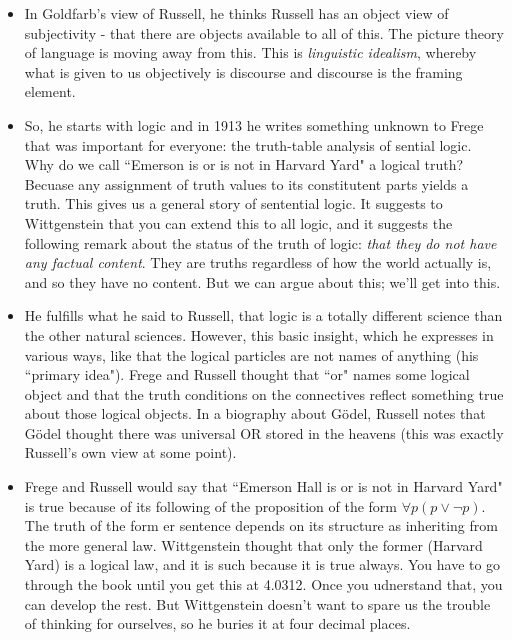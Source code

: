 \documentclass[12pt]{article}
\theoremstyle{definition}
\begin{document}
\begin{itemize}
    \item In Goldfarb's view of Russell, he thinks Russell has an object view of subjectivity - that there are objects available to all of this. The picture theory of language is moving away from this. This is \textit{linguistic idealism}, whereby what is given to us objectively is discourse and discourse is the framing element.
    \item So, he starts with logic and in 1913 he writes something unknown to Frege that was important for everyone: the truth-table analysis of sential logic. Why do we call ``Emerson is or is not in Harvard Yard" a logical truth? Becuase any assignment of truth values to its constitutent parts yields a truth. This gives us a general story of sentential logic. It suggests to Wittgenstein that you can extend this to all logic, and it suggests the following remark about the status of the truth of logic: \textit{that they do not have any factual content}. They are truths regardless of how the world actually is, and so they have no content. But we can argue about this; we'll get into this.
    \item He fulfills what he said to Russell, that logic is a totally different science than the other natural sciences. However, this basic insight, which he expresses in various ways, like that the logical particles are not names of anything (his ``primary idea"). Frege and Russell thought that ``or" names some logical object and that the truth conditions on the connectives reflect something true about those logical objects. In a biography about G\"odel, Russell notes that G\"odel thought there was universal OR stored in the heavens (this was exactly Russell's own view at some point).
    \item Frege and Russell would say that ``Emerson Hall is or is not in Harvard Yard" is true because of its following of the proposition of the form $\forall p(p \vee \neg p)$. The truth of the form er sentence depends on its structure as inheriting from the more general law. Wittgenstein thought that only the former (Harvard Yard) is a logical law, and it is such because it is true always. You have to go through the book until you get this at 4.0312. Once you udnerstand that, you can develop the rest. But Wittgenstein doesn't want to spare us the trouble of thinking for ourselves, so he buries it at four decimal places.

\end{itemize}
\end{document}
